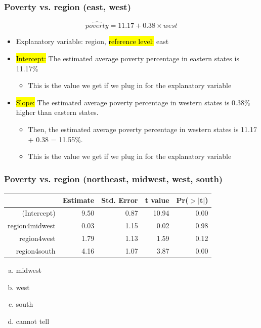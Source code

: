 
\begin{frame}
\frametitle{Poverty vs. region (east, west)}


\[ \widehat{poverty} = 11.17 + 0.38 \times west \]

\begin{itemize}

\item Explanatory variable: region, \hl{reference level:} east

\item \hl{Intercept:} The estimated average poverty percentage in eastern states is 11.17\%
\pause
\begin{itemize}
\item This is the value we get if we plug in  for the explanatory variable
\end{itemize}

\pause

\item \hl{Slope:} The estimated average poverty percentage in western states is 0.38\% higher than eastern states.
\pause
\begin{itemize}
\item Then, the estimated average poverty percentage in western states is 11.17 + 0.38 =  11.55\%.
\pause
\item This is the value we get if we plug in  for the explanatory variable
\end{itemize}

\end{itemize}

\end{frame}


\begin{frame}
\frametitle{Poverty vs. region (northeast, midwest, west, south)}


{\small
\begin{center}
\begin{tabular}{rrrrr}
  \hline
 & Estimate & Std. Error & t value & Pr($>$$|$t$|$) \\ 
  \hline
(Intercept) & 9.50 & 0.87 & 10.94 & 0.00 \\ 
region4midwest & 0.03 & 1.15 & 0.02 & 0.98 \\ 
region4west & 1.79 & 1.13 & 1.59 & 0.12 \\ 
region4south & 4.16 & 1.07 & 3.87 & 0.00 \\ 
   \hline
\end{tabular}
\end{center}
}

\begin{enumerate}[(a)]
\item midwest
\item west
\item south
\item cannot tell
\end{enumerate}

\end{frame}

